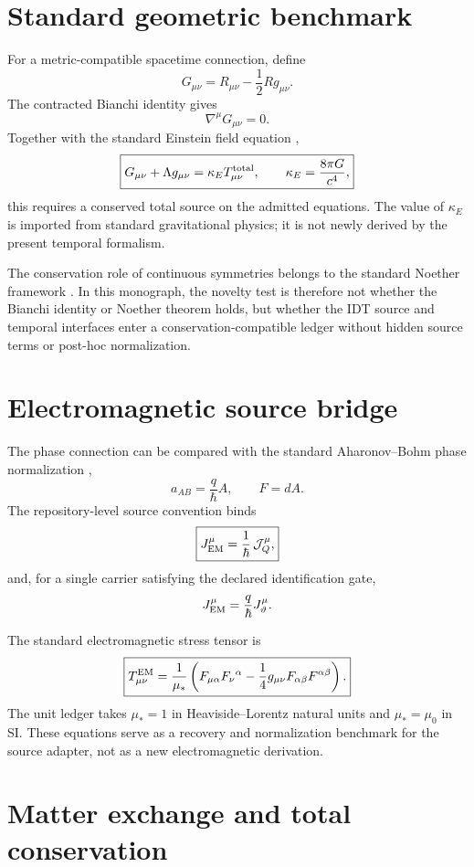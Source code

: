 \documentclass[11pt]{book}
\begin{document}
\section{Standard geometric benchmark}

For a metric-compatible spacetime connection, define
\[
G_{\mu\nu}=R_{\mu\nu}-\frac12Rg_{\mu\nu}.
\]
The contracted Bianchi identity gives
\[
\boxed{\nabla^\mu G_{\mu\nu}=0.}
\]
Together with the standard Einstein field equation \cite{Einstein1916},
\[
\boxed{
G_{\mu\nu}+\Lambda g_{\mu\nu}
=
\kappa_E T^{\rm total}_{\mu\nu},
\qquad
\kappa_E=\frac{8\pi G}{c^4},
}
\]
this requires a conserved total source on the admitted equations. The value of \(\kappa_E\) is imported from standard gravitational physics; it is not newly derived by the present temporal formalism.

The conservation role of continuous symmetries belongs to the standard Noether framework \cite{Noether1971}. In this monograph, the novelty test is therefore not whether the Bianchi identity or Noether theorem holds, but whether the IDT source and temporal interfaces enter a conservation-compatible ledger without hidden source terms or post-hoc normalization.

\section{Electromagnetic source bridge}

The phase connection can be compared with the standard Aharonov--Bohm phase normalization \cite{AharonovBohm1959},
\[
a_{AB}=\frac{q}{\hbar}A,
\qquad
F=dA.
\]
The repository-level source convention binds
\[
\boxed{
J_{\rm EM}^{\mu}=\frac{1}{\hbar}\,\mathcal J_Q^{\mu},
}
\]
and, for a single carrier satisfying the declared identification gate,
\[
J_{\rm EM}^{\mu}=\frac{q}{\hbar}J_{\vartheta}^{\mu}.
\]

The standard electromagnetic stress tensor is
\[
\boxed{
T^{\rm EM}_{\mu\nu}
=
\frac{1}{\mu_*}
\left(
F_{\mu\alpha}F_{\nu}{}^{\alpha}
-\frac14g_{\mu\nu}F_{\alpha\beta}F^{\alpha\beta}
\right).
}
\]
The unit ledger takes \(\mu_*=1\) in Heaviside--Lorentz natural units and \(\mu_*=\mu_0\) in SI. These equations serve as a recovery and normalization benchmark for the source adapter, not as a new electromagnetic derivation.

\section{Matter exchange and total conservation}
\end{document}
